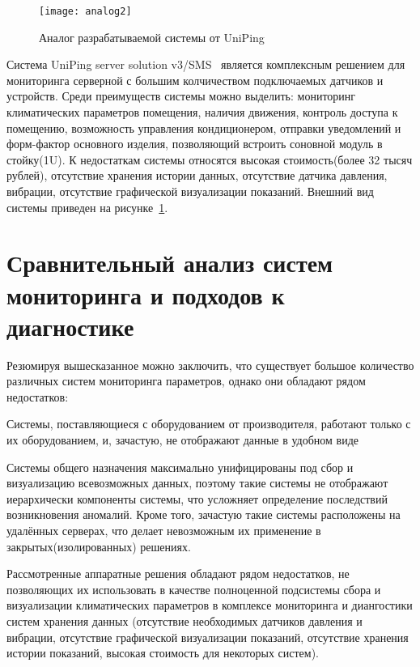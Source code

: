 \begin{figure}[!h]
	\centering
	\texttt{[image: analog2]}
	\caption{Аналог разрабатываемой системы от  UniPing}
	\label{fig:analog2}
\end{figure}

Система UniPing server solution v3/SMS~\cite{analog2} является комплексным решением для мониторинга серверной с большим колчичеством подключаемых датчиков и устройств. Среди преимуществ системы можно выделить: мониторинг климатических параметров помещения, наличия движения, контроль доступа к помещению, возможность управления кондиционером, отправки уведомлений и форм-фактор основного изделия, позволяющий встроить  соновной модуль в стойку(1U). К недостаткам системы относятся высокая стоимость(более 32 тысяч рублей), отсутствие хранения истории данных, отсутствие датчика давления, вибрации, отсутствие графической визуализации показаний. Внешний вид системы приведен на рисунке~\ref{fig:analog2}.  

\section{Сравнительный анализ систем мониторинга и подходов к диагностике}

Резюмируя вышесказанное можно заключить, что существует большое количество различных систем мониторинга параметров, однако они обладают рядом недостатков:
\begin{itemize*}
	\item{Системы, поставляющиеся с оборудованием от производителя, работают только с их оборудованием, и, зачастую, не отображают данные в удобном виде}
	\item{Системы общего назначения максимально унифицированы под сбор и визуализацию всевозможных данных, поэтому такие системы не отображают иерархически компоненты системы, что усложняет определение последствий возникновения аномалий.  Кроме того, зачастую такие системы расположены на удалённых серверах, что делает невозможным их применение в закрытых(изолированных) решениях.}
\end{itemize*}

Рассмотренные аппаратные решения обладают рядом недостатков, не позволяющих их использовать в качестве полноценной подсистемы сбора и визуализации климатических параметров в комплексе мониторинга и диангостики систем хранения данных (отсутствие необходимых датчиков давления и вибрации, отсутствие графической визуализации показаний, отсутствие хранения истории показаний, высокая стоимость для некоторых систем).

